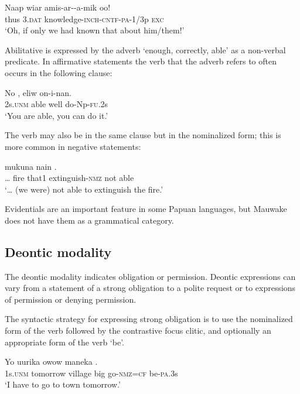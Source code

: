 \ea%
\label{ex:x1056}
\gll Naap  wiar  amis-ar--a-mik  oo! \\
thus  3.\textsc{dat}  knowledge-\textsc{inch}-\textsc{cntf}-\textsc{pa}-1/3p  \textsc{exc}\\
\glt `Oh, if only we had known that about him/them!'
\z

Abilitative is expressed by the adverb  `enough, correctly, able' as a non-verbal predicate. In affirmative statements the verb that the adverb refers to often occurs in the following clause:

\ea%
\label{ex:x1089}
\gll No  ,  eliw  on-i-nan. \\
2s.\textsc{unm}  able  well  do-Np-\textsc{fu}.2s\\
\glt `You are able, you can do it.'
\z

The verb may also be in the same clause but in the nominalized form; this is more common in negative statements:

\ea%
\label{ex:x1088}
\gll {\dots} mukuna  nain    . \\
{\dots} fire that1  extinguish-\textsc{nmz} not  able\\
\glt `{\dots} (we were) not able to extinguish the fire.'
\z

Evidentials are an important feature in some Papuan languages, but Mauwake does not have them as a grammatical category.

\subsection{Deontic modality}
{}
The deontic modality indicates obligation or permission. Deontic expressions can vary from a statement of a strong obligation to a polite request or to expressions of permission or denying permission. 

The syntactic strategy for expressing strong obligation is to use the nominalized form of the verb followed by the contrastive focus clitic, and optionally an appropriate form of the verb `be'. 

\ea%
\label{ex:x1077}
\gll Yo  uurika  owow  maneka    . \\
1s.\textsc{unm}  tomorrow  village  big  go-\textsc{nmz}=\textsc{cf}  be-\textsc{pa}.3s\\
\glt `I have to go to town tomorrow.'
\z

